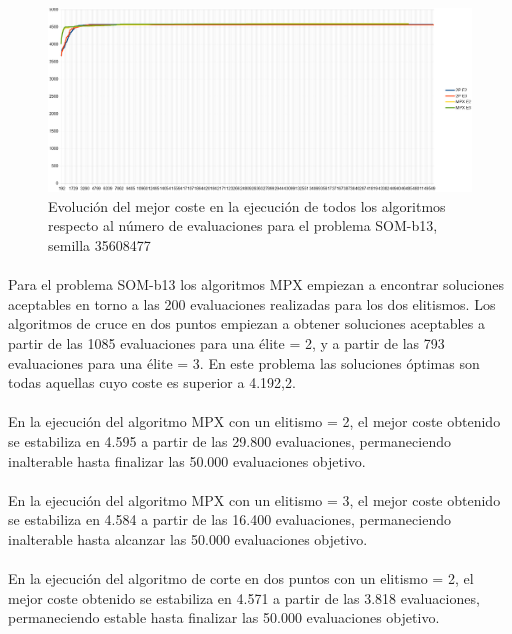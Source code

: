 	\begin{figure}[H]
		\centering
		\includegraphics[scale=0.3]{img/35608477_SOM-b_13_n300_m90.png}
		\caption{Evolución del mejor coste en la ejecución de todos los algoritmos respecto al número de evaluaciones para el problema SOM-b13, semilla 35608477}
		\label{SOM-b_13_historico}
	\end{figure}

	\paragraph{}Para el problema SOM-b13 los algoritmos MPX empiezan a encontrar soluciones aceptables en torno a las 200 evaluaciones realizadas para los dos elitismos. Los algoritmos de cruce en dos puntos empiezan a obtener soluciones aceptables a partir de las 1085 evaluaciones para una élite = 2, y a partir de las 793 evaluaciones para una élite = 3. En este problema las soluciones óptimas son todas aquellas cuyo coste es superior a 4.192,2.
	
	\paragraph{}En la ejecución del algoritmo MPX con un elitismo = 2, el mejor coste obtenido se estabiliza en 4.595 a partir de las 29.800 evaluaciones, permaneciendo inalterable hasta finalizar las 50.000 evaluaciones objetivo.
	
	\paragraph{}En la ejecución del algoritmo MPX con un elitismo = 3, el mejor coste obtenido se estabiliza en 4.584 a partir de las 16.400 evaluaciones, permaneciendo inalterable hasta alcanzar las 50.000 evaluaciones objetivo.
	
	\paragraph{}En la ejecución del algoritmo de corte en dos puntos con un elitismo = 2, el mejor coste obtenido se estabiliza en 4.571 a partir de las 3.818 evaluaciones, permaneciendo estable hasta finalizar las 50.000 evaluaciones objetivo.
	
